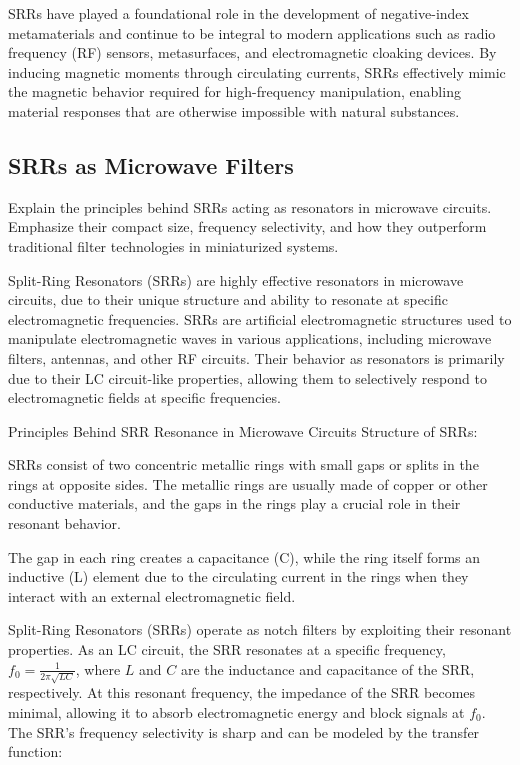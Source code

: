 \documentclass[conference]{IEEEtran}
\begin{document}
SRRs have played a foundational role in the development of negative-index metamaterials and continue to be integral to modern applications such as radio frequency (RF) sensors, metasurfaces, and electromagnetic cloaking devices. By inducing magnetic moments through circulating currents, SRRs effectively mimic the magnetic behavior required for high-frequency manipulation, enabling material responses that are otherwise impossible with natural substances.



\subsection{SRRs as Microwave Filters}
Explain the principles behind SRRs acting as resonators in microwave circuits. Emphasize their compact size, frequency selectivity, and how they outperform traditional filter technologies in miniaturized systems.

Split-Ring Resonators (SRRs) are highly effective resonators in microwave circuits, due to their unique structure and ability to resonate at specific electromagnetic frequencies. SRRs are artificial electromagnetic structures used to manipulate electromagnetic waves in various applications, including microwave filters, antennas, and other RF circuits. Their behavior as resonators is primarily due to their LC circuit-like properties, allowing them to selectively respond to electromagnetic fields at specific frequencies.

Principles Behind SRR Resonance in Microwave Circuits
Structure of SRRs:

SRRs consist of two concentric metallic rings with small gaps or splits in the rings at opposite sides. The metallic rings are usually made of copper or other conductive materials, and the gaps in the rings play a crucial role in their resonant behavior.

The gap in each ring creates a capacitance (C), while the ring itself forms an inductive (L) element due to the circulating current in the rings when they interact with an external electromagnetic field.



Split-Ring Resonators (SRRs) operate as notch filters by exploiting their resonant properties. As an LC circuit, the SRR resonates at a specific frequency, \( f_0 = \frac{1}{2\pi \sqrt{LC}} \), where \( L \) and \( C \) are the inductance and capacitance of the SRR, respectively. At this resonant frequency, the impedance of the SRR becomes minimal, allowing it to absorb electromagnetic energy and block signals at \( f_0 \). The SRR's frequency selectivity is sharp and can be modeled by the transfer function:
\end{document}
